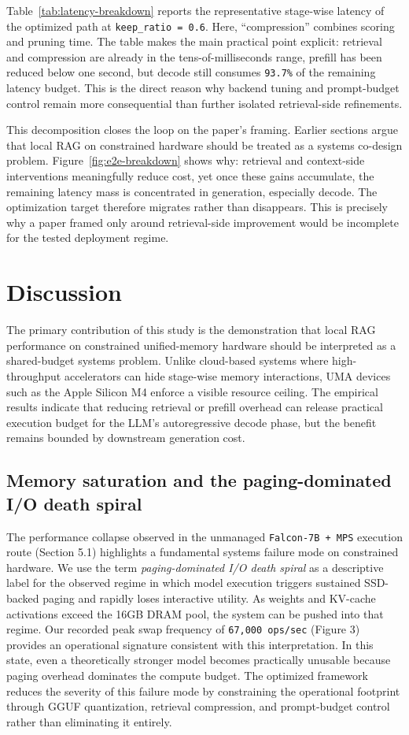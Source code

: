 \documentclass[10pt,twocolumn]{article}
\begin{document}
Table~\ref{tab:latency-breakdown} reports the representative stage-wise latency of the optimized path at \texttt{keep\_ratio = 0.6}. Here, ``compression'' combines scoring and pruning time. The table makes the main practical point explicit: retrieval and compression are already in the tens-of-milliseconds range, prefill has been reduced below one second, but decode still consumes \texttt{93.7\%} of the remaining latency budget. This is the direct reason why backend tuning and prompt-budget control remain more consequential than further isolated retrieval-side refinements.

This decomposition closes the loop on the paper's framing. Earlier sections argue that local RAG on constrained hardware should be treated as a systems co-design problem. Figure~\ref{fig:e2e-breakdown} shows why: retrieval and context-side interventions meaningfully reduce cost, yet once these gains accumulate, the remaining latency mass is concentrated in generation, especially decode. The optimization target therefore migrates rather than disappears. This is precisely why a paper framed only around retrieval-side improvement would be incomplete for the tested deployment regime.

\section{Discussion}

The primary contribution of this study is the demonstration that local RAG performance on constrained unified-memory hardware should be interpreted as a shared-budget systems problem. Unlike cloud-based systems where high-throughput accelerators can hide stage-wise memory interactions, UMA devices such as the Apple Silicon M4 enforce a visible resource ceiling. The empirical results indicate that reducing retrieval or prefill overhead can release practical execution budget for the LLM's autoregressive decode phase, but the benefit remains bounded by downstream generation cost.

\subsection{Memory saturation and the paging-dominated I/O death spiral}

The performance collapse observed in the unmanaged \texttt{Falcon-7B + MPS} execution route (Section 5.1) highlights a fundamental systems failure mode on constrained hardware. We use the term \emph{paging-dominated I/O death spiral} as a descriptive label for the observed regime in which model execution triggers sustained SSD-backed paging and rapidly loses interactive utility. As weights and KV-cache activations exceed the 16GB DRAM pool, the system can be pushed into that regime. Our recorded peak swap frequency of \texttt{67,000 ops/sec} (Figure 3) provides an operational signature consistent with this interpretation. In this state, even a theoretically stronger model becomes practically unusable because paging overhead dominates the compute budget. The optimized framework reduces the severity of this failure mode by constraining the operational footprint through GGUF quantization, retrieval compression, and prompt-budget control rather than eliminating it entirely.
\end{document}
